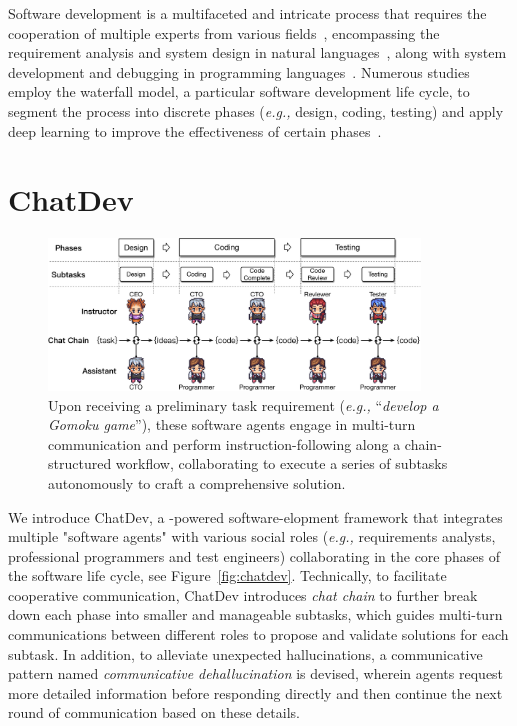 \documentclass[11pt]{article}
\newcommand{\eg}{\textit{e.g., }}
\begin{document}
Software development is a multifaceted and intricate process that requires the cooperation of multiple experts from various fields~\cite{yilmaz2012systematic,acuna2006emphasizing,basili1989software,sawyer1998software,banker1998software,france2007model}, encompassing the requirement analysis and system design in natural languages~\cite{DBLP:conf/re/PudlitzBV19,DBLP:journals/jss/MartinA15,DBLP:conf/icse/NaharZLK22}, along with system development and debugging in programming languages~\cite{DBLP:conf/wcre/GaoCXMSL19,DBLP:conf/icse/WangLT16,DBLP:conf/icse/WanLXLHM022}.
Numerous studies employ the waterfall model, a particular software development life cycle, to segment the process into discrete phases (\eg design, coding, testing) and apply deep learning to improve the effectiveness of certain phases~\cite{DBLP:conf/se/WinklerGV20,DBLP:conf/icse/EzziniA0S22,DBLP:conf/wcre/ThallerLE19,DBLP:conf/icse/ZhaoCL021,DBLP:conf/iclr/NijkampPHTWZSX23,DBLP:conf/kbse/WanZYXY0Y18,DBLP:conf/icse/WangSSWWN21}. 

\section{ChatDev}
\begin{figure}[htbp]
  \centering
  \includegraphics[width=0.88\textwidth]{figs/chat_chain.pdf}
  \caption{Upon receiving a preliminary task requirement (\eg ``\textit{develop a Gomoku game}''), these software agents engage in multi-turn communication and perform instruction-following along a chain-structured workflow, collaborating to execute a series of subtasks autonomously to craft a comprehensive solution.}
  \label{fig:chatchain}
\end{figure}

We introduce ChatDev, a -powered software-elopment framework that integrates multiple "software agents" with various social roles (\eg requirements analysts, professional programmers and test engineers) collaborating in the core phases of the software life cycle, see Figure~\ref{fig:chatdev}.
Technically, to facilitate cooperative communication, ChatDev introduces \textit{chat chain} to further break down each phase into smaller and manageable subtasks, which guides multi-turn communications between different roles to propose and validate solutions for each subtask.
In addition, to alleviate unexpected hallucinations, a communicative pattern named \textit{communicative dehallucination} is devised, wherein agents request more detailed information before responding directly and then continue the next round of communication based on these details.
\end{document}
